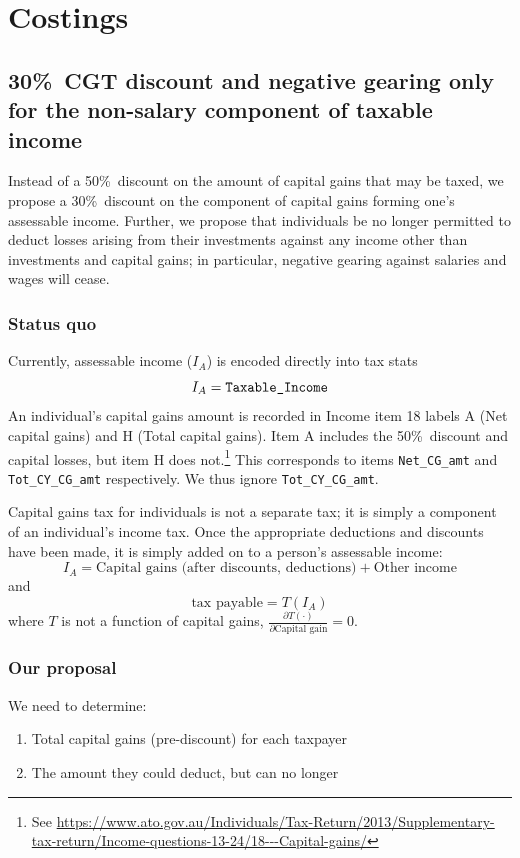 \documentclass{grattan}\usepackage[]{graphicx}\usepackage[]{color}
\begin{document}
\chapter{Costings}
\section{30\%\ CGT discount and negative gearing only for the non-salary component of taxable income}
Instead of a 50\%\ discount on the amount of capital gains that may be taxed, we propose a 30\%\ discount on the component of capital gains forming one's assessable income. Further, we propose that individuals be no longer permitted to deduct losses arising from their investments against any income other than investments and capital gains; in particular, negative gearing against salaries and wages will cease.
\subsection{Status quo}
Currently, assessable income ($I_A$) is encoded directly into tax stats
\[I_A = \verb=Taxable_Income=\]
An individual's capital gains amount is recorded in Income item 18 labels A (Net capital gains) and H (Total capital gains). Item A includes the 50\%\ discount and capital losses, but item H does not.\footnote{See \url{https://www.ato.gov.au/Individuals/Tax-Return/2013/Supplementary-tax-return/Income-questions-13-24/18---Capital-gains/}} This corresponds to items \verb=Net_CG_amt= and \verb=Tot_CY_CG_amt= respectively. We thus ignore \verb=Tot_CY_CG_amt=.

Capital gains tax for individuals is not a separate tax; it is simply a component of an individual's income tax. Once the appropriate deductions and discounts have been made, it is simply added on to a person's assessable income:
\[I_A = \text{Capital gains (after discounts, deductions)} + \text{Other income}\]
and
\[\text{tax payable} = T(I_A)\]
where $T$ is not a function of capital gains, $\frac{\partial T(\cdot)}{\partial \text{Capital gain}} = 0$.
%
\subsection{Our proposal}
We need to determine:
\begin{enumerate}
\item Total capital gains (pre-discount) for each taxpayer
\item The amount they could deduct, but can no longer
\end{enumerate}
\end{document}
